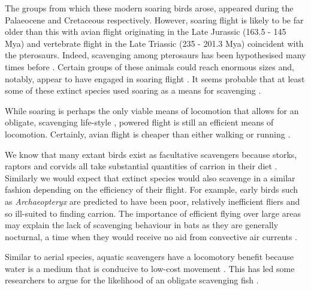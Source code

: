 \documentclass[a4paper,12pt]{article}
\begin{document}
The groups from which these modern soaring birds arose, appeared during the Palaeocene \citep[66 - 56 Million years ago (Mya); ][]{Jetz2012, Jarvis2014} and Cretaceous \citep[145.5 - 65.5 Mya; ][]{chiappe2006early} respectively. 
However, soaring flight is likely to be far older than this with avian flight originating in the Late Jurassic (163.5 - 145 Mya) and vertebrate flight in the Late Triassic (235 - 201.3 Mya) coincident with the pterosaurs. 
Indeed, scavenging among pterosaurs has been hypothesised many times before \citep{witton2008reappraisal}. 
Certain groups of these animals could reach enormous sizes \citep[e.g. Azhdarchids with wingspans of 11 metres; ][]{witton2010size} and, notably, appear to have engaged in soaring flight \citep{witton2010size}.
It seems probable that at least some of these extinct species used soaring as a means for scavenging \citep{witton2013pterosaurs}. 

While soaring is perhaps the only viable means of locomotion that allows for an obligate, scavenging life-style \citep{ruxton2004obligate}, powered flight is still an efficient means of locomotion. 
Certainly, avian flight is cheaper than either walking or running \citep{tucker1975energetic}.

We know that many extant birds exist as facultative scavengers because storks, raptors and corvids all take substantial quantities of carrion in their diet \textcolor{blue}{\citep{mateo2015regional}}. 
Similarly we would expect that extinct species would also scavenge in a similar fashion depending on the efficiency of their flight. 
For example, early birds such as \textit{Archaeopteryx} are predicted to have been poor, relatively inefficient fliers \citep{nudds2010narrow} and so ill-suited to finding carrion. 
The importance of efficient flying over large areas may explain the lack of scavenging behaviour in bats as they are generally nocturnal, a time when they would receive no aid from convective air currents \citep{norberg2012vertebrate}. 

Similar to aerial species, aquatic scavengers have a locomotory benefit because water is a medium that is conducive to low-cost movement \citep{tucker1975energetic,williams1999evolution}.
This has led some researchers to argue for the likelihood of an obligate scavenging fish \citep{ruxton2004energetic,ruxton2005searching}. 
\end{document}
